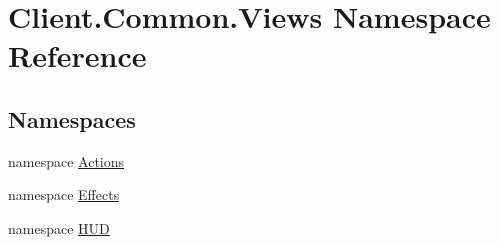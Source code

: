 \hypertarget{namespaceClient_1_1Common_1_1Views}{}\section{Client.\+Common.\+Views Namespace Reference}
\label{namespaceClient_1_1Common_1_1Views}
\subsection*{Namespaces}
\begin{DoxyCompactItemize}
\item 
namespace \hyperlink{namespaceClient_1_1Common_1_1Views_1_1Actions}{Actions}
\item 
namespace \hyperlink{namespaceClient_1_1Common_1_1Views_1_1Effects}{Effects}
\item 
namespace \hyperlink{namespaceClient_1_1Common_1_1Views_1_1HUD}{H\+U\+D}
\end{DoxyCompactItemize}
